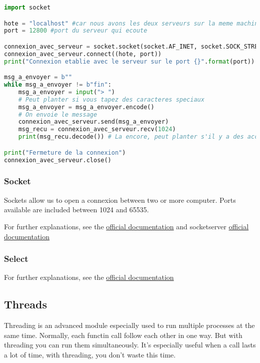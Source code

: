 \documentclass[a4paper, 12pt, titlepage]{scrartcl} %
\begin{document}
\begin{lstlisting}[language=Python]
import socket

hote = "localhost" #car nous avons les deux serveurs sur la meme machine
port = 12800 #port du serveur qui ecoute

connexion_avec_serveur = socket.socket(socket.AF_INET, socket.SOCK_STREAM)
connexion_avec_serveur.connect((hote, port))
print("Connexion etablie avec le serveur sur le port {}".format(port))

msg_a_envoyer = b""
while msg_a_envoyer != b"fin":
    msg_a_envoyer = input("> ")
    # Peut planter si vous tapez des caracteres speciaux
    msg_a_envoyer = msg_a_envoyer.encode()
    # On envoie le message
    connexion_avec_serveur.send(msg_a_envoyer)
    msg_recu = connexion_avec_serveur.recv(1024)
    print(msg_recu.decode()) # La encore, peut planter s'il y a des accents

print("Fermeture de la connexion")
connexion_avec_serveur.close()
\end{lstlisting} \vspace{5mm}

\subsubsection{Socket}
Sockets allow us to open a connexion between two or more computer. Ports available are included between 1024 and 65535. 

\vspace{5mm}

For further explanations, see the \href{https://docs.python.org/3/library/socket.html}{official documentation} and socketserver  \href{https://docs.python.org/3/library/socketserver.html}{official documentation} 
\subsubsection{Select}
For further explanations, see the \href{https://docs.python.org/3/library/select.html}{official documentation}

\subsection{Threads}
\label{subsec:Threading}
Threading is an advanced module especially used to run multiple processes at the same time. Normally, each functin call follow each other in one way. But with threading you can run them simultaneously. It's especially useful when a call lasts a lot of time, with threading, you don't waste this time.
\end{document}
